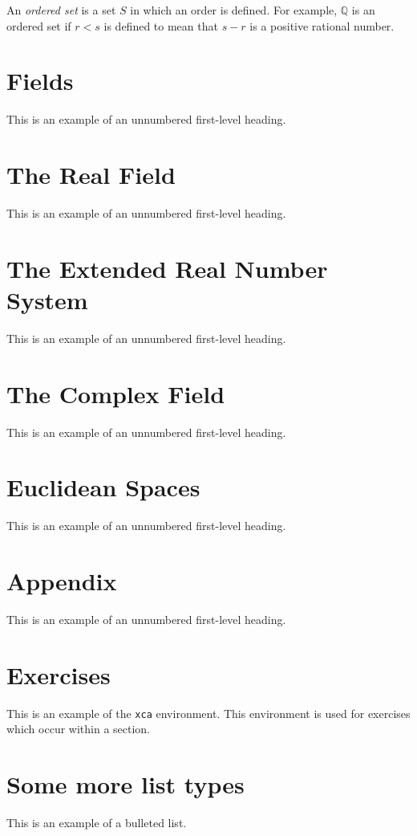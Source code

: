 \begin{definition}
  An \emph{ordered set} is a set $S$ in which an order is defined. For example, $\mathbb{Q}$ is an ordered set if 
  $r<s$ is defined to mean that $s-r$ is a positive rational number.
\end{definition}


\section*{Fields}
This is an example of an unnumbered first-level heading.
\section*{The Real Field}
This is an example of an unnumbered first-level heading.
\section*{The Extended Real Number System}
This is an example of an unnumbered first-level heading.
\section*{The Complex Field}
This is an example of an unnumbered first-level heading.
\section*{Euclidean Spaces}
This is an example of an unnumbered first-level heading.
\section*{Appendix}
This is an example of an unnumbered first-level heading.
\section*{Exercises}
\begin{xca}
  This is an example of the \texttt{xca} environment. This environment is
  used for exercises which occur within a section.
  \end{xca}





  \section{Some more list types}
This is an example of a bulleted list.

